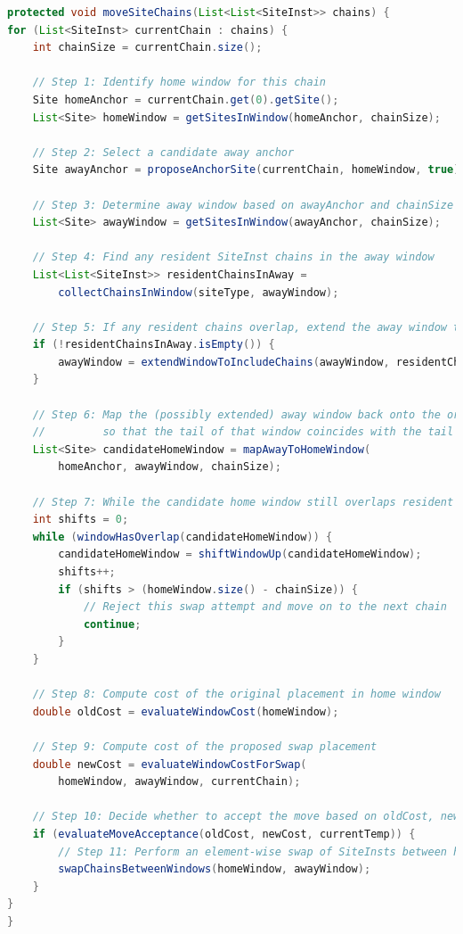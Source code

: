 \newcolumn
\begin{lstlisting}[language=Java, caption={Chain Swapping Pseudocode}, label={lst:chain_swap_pseudocode}]
protected void moveSiteChains(List<List<SiteInst>> chains) {
for (List<SiteInst> currentChain : chains) {
    int chainSize = currentChain.size();

    // Step 1: Identify home window for this chain
    Site homeAnchor = currentChain.get(0).getSite();
    List<Site> homeWindow = getSitesInWindow(homeAnchor, chainSize);

    // Step 2: Select a candidate away anchor
    Site awayAnchor = proposeAnchorSite(currentChain, homeWindow, true);

    // Step 3: Determine away window based on awayAnchor and chainSize
    List<Site> awayWindow = getSitesInWindow(awayAnchor, chainSize);

    // Step 4: Find any resident SiteInst chains in the away window
    List<List<SiteInst>> residentChainsInAway = 
        collectChainsInWindow(siteType, awayWindow);

    // Step 5: If any resident chains overlap, extend the away window to include them
    if (!residentChainsInAway.isEmpty()) {
        awayWindow = extendWindowToIncludeChains(awayWindow, residentChainsInAway);
    }

    // Step 6: Map the (possibly extended) away window back onto the original region 
    //         so that the tail of that window coincides with the tail of the current chain
    List<Site> candidateHomeWindow = mapAwayToHomeWindow(
        homeAnchor, awayWindow, chainSize);

    // Step 7: While the candidate home window still overlaps resident chains, shift upward
    int shifts = 0;
    while (windowHasOverlap(candidateHomeWindow)) {
        candidateHomeWindow = shiftWindowUp(candidateHomeWindow);
        shifts++;
        if (shifts > (homeWindow.size() - chainSize)) {
            // Reject this swap attempt and move on to the next chain
            continue;
        }
    }

    // Step 8: Compute cost of the original placement in home window
    double oldCost = evaluateWindowCost(homeWindow);

    // Step 9: Compute cost of the proposed swap placement
    double newCost = evaluateWindowCostForSwap(
        homeWindow, awayWindow, currentChain);

    // Step 10: Decide whether to accept the move based on oldCost, newCost, and temperature
    if (evaluateMoveAcceptance(oldCost, newCost, currentTemp)) {
        // Step 11: Perform an element-wise swap of SiteInsts between homeWindow and awayWindow
        swapChainsBetweenWindows(homeWindow, awayWindow);
    }
}
}
\end{lstlisting}


